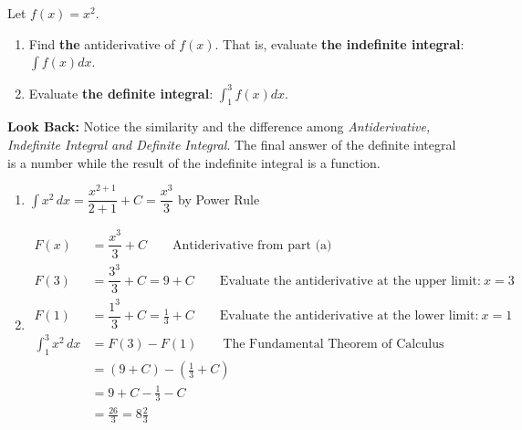 \begin{example}
Let $f(x)=x^2$. 
\renewcommand{\labelenumi}{\textbf{(\alph{enumi})}}
\begin{enumerate}[leftmargin=*]
\item Find \textbf{the} antiderivative of $f(x)$. That is, evaluate \textbf{the indefinite integral}: $\displaystyle \int f(x) dx$. 
\item Evaluate \textbf{the definite integral}: $\displaystyle \int_{1}^{3} f(x) dx$.
\end{enumerate}
\noindent \textbf{Look Back:} Notice the similarity and the difference among  \emph{Antiderivative, Indefinite Integral and Definite Integral}. The final answer of the definite integral is a number while the result of the indefinite integral is a function.
    \begin{sol}
    \end{sol}
    \begin{solL}
    \renewcommand{\labelenumi}{\textbf{(\alph{enumi})}}
    \begin{enumerate}[leftmargin=*]
    \item \hfill 
    \newline 
    $\int x^2\,dx=\dfrac{x^{2+1}}{2+1}+C=\dfrac{x^3}{3}$ \qquad by Power Rule
    \item \hfill 
    \newline 
        \begin{displaymath}
            \begin{split}
            F(x)&=\dfrac{x^3}{3}+C \qquad \text{Antiderivative from part (a)}\\
            F(3)&=\dfrac{3^3}{3}+C=9+C  \qquad \text{Evaluate the antiderivative at the upper limit:}\: x=3\\
            F(1)&=\dfrac{1^3}{3}+C=\frac{1}{3}+C  \qquad \text{Evaluate the antiderivative at the lower limit:}\: x=1\\
            \int^3_1 x^2\,dx&=F(3)-F(1)\qquad \text{The Fundamental Theorem of Calculus}\\
            &=(9+C)-\left(\frac{1}{3}+C\right) \\
            &=9+C-\frac{1}{3}-C\\
            &=\frac{26}{3}=8\frac{2}{3}
            \end{split}
        \end{displaymath}
    \end{enumerate}
    
    \end{solL}
    
\end{example}

